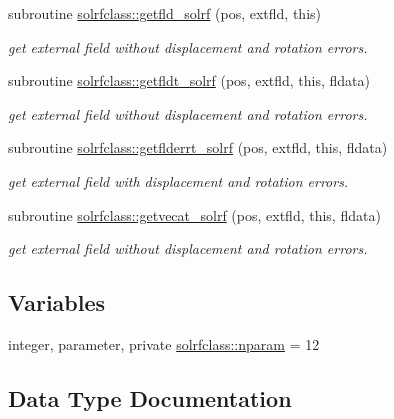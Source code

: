 \begin{DoxyCompactItemize}
subroutine \mbox{\hyperlink{namespacesolrfclass_a394f9bb9d3b50c8652a704f3c5af16ef}{solrfclass\+::getfld\+\_\+solrf}} (pos, extfld, this)
\begin{DoxyCompactList}\small\item\em get external field without displacement and rotation errors. \end{DoxyCompactList}\item 
subroutine \mbox{\hyperlink{namespacesolrfclass_ac164c5b7477e8ec4278009bd85cd4338}{solrfclass\+::getfldt\+\_\+solrf}} (pos, extfld, this, fldata)
\begin{DoxyCompactList}\small\item\em get external field without displacement and rotation errors. \end{DoxyCompactList}\item 
subroutine \mbox{\hyperlink{namespacesolrfclass_a81aef201f157970a5566536d7738c3f9}{solrfclass\+::getflderrt\+\_\+solrf}} (pos, extfld, this, fldata)
\begin{DoxyCompactList}\small\item\em get external field with displacement and rotation errors. \end{DoxyCompactList}\item 
subroutine \mbox{\hyperlink{namespacesolrfclass_a617250299f3409a89fdb6651f353bc8d}{solrfclass\+::getvecat\+\_\+solrf}} (pos, extfld, this, fldata)
\begin{DoxyCompactList}\small\item\em get external field without displacement and rotation errors. \end{DoxyCompactList}\end{DoxyCompactItemize}
\subsection*{Variables}
\begin{DoxyCompactItemize}
\item 
integer, parameter, private \mbox{\hyperlink{namespacesolrfclass_a01b965e25069cff9fb1797fbbcb9939d}{solrfclass\+::nparam}} = 12
\end{DoxyCompactItemize}


\subsection{Data Type Documentation}
\label{structsolrfclass_1_1solrf}
